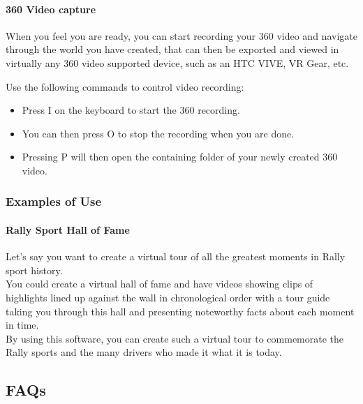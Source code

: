 \documentclass{article}
\begin{document}
			\paragraph{360 Video capture}

			When you feel you are ready, you can start recording your 360 video and navigate through the world you have created, that can then be exported and viewed in virtually any 360 video supported device, such as an HTC VIVE, VR Gear, etc.

			Use the following commands to control video recording:

			\begin{itemize}

				\item Press I on the keyboard to start the 360 recording.

				\item You can then press O to stop the recording when you are done.

				\item Pressing P will then open the containing folder of your newly created 360 video.

			\end{itemize}


		\subsubsection{Examples of Use}

			\paragraph{Rally Sport Hall of Fame}

				Let's say you want to create a virtual tour of all the greatest moments in Rally sport history.\\
				You could create a virtual hall of fame and have videos showing clips of highlights lined up against the wall in chronological order with a tour guide taking you through this hall and presenting noteworthy facts about each moment in time.\\		
				By using this software, you can create such a virtual tour to commemorate the Rally sports and the many drivers who made it what it is today.




	\subsection{FAQs}
\end{document}
